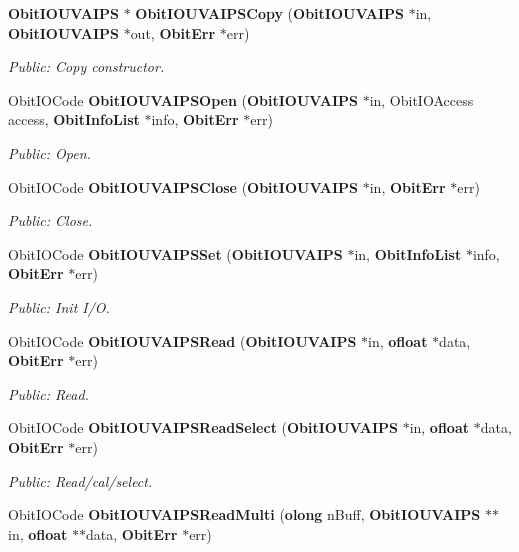 \begin{CompactItemize}
{\bf Obit\-IOUVAIPS} $\ast$ {\bf Obit\-IOUVAIPSCopy} ({\bf Obit\-IOUVAIPS} $\ast$in, {\bf Obit\-IOUVAIPS} $\ast$out, {\bf Obit\-Err} $\ast$err)
\begin{CompactList}\small\item\em Public: Copy constructor. \item\end{CompactList}\item 
Obit\-IOCode {\bf Obit\-IOUVAIPSOpen} ({\bf Obit\-IOUVAIPS} $\ast$in, Obit\-IOAccess access, {\bf Obit\-Info\-List} $\ast$info, {\bf Obit\-Err} $\ast$err)
\begin{CompactList}\small\item\em Public: Open. \item\end{CompactList}\item 
Obit\-IOCode {\bf Obit\-IOUVAIPSClose} ({\bf Obit\-IOUVAIPS} $\ast$in, {\bf Obit\-Err} $\ast$err)
\begin{CompactList}\small\item\em Public: Close. \item\end{CompactList}\item 
Obit\-IOCode {\bf Obit\-IOUVAIPSSet} ({\bf Obit\-IOUVAIPS} $\ast$in, {\bf Obit\-Info\-List} $\ast$info, {\bf Obit\-Err} $\ast$err)
\begin{CompactList}\small\item\em Public: Init I/O. \item\end{CompactList}\item 
Obit\-IOCode {\bf Obit\-IOUVAIPSRead} ({\bf Obit\-IOUVAIPS} $\ast$in, {\bf ofloat} $\ast$data, {\bf Obit\-Err} $\ast$err)
\begin{CompactList}\small\item\em Public: Read. \item\end{CompactList}\item 
Obit\-IOCode {\bf Obit\-IOUVAIPSRead\-Select} ({\bf Obit\-IOUVAIPS} $\ast$in, {\bf ofloat} $\ast$data, {\bf Obit\-Err} $\ast$err)
\begin{CompactList}\small\item\em Public: Read/cal/select. \item\end{CompactList}\item 
Obit\-IOCode {\bf Obit\-IOUVAIPSRead\-Multi} ({\bf olong} n\-Buff, {\bf Obit\-IOUVAIPS} $\ast$$\ast$in, {\bf ofloat} $\ast$$\ast$data, {\bf Obit\-Err} $\ast$err)

\end{CompactItemize}
